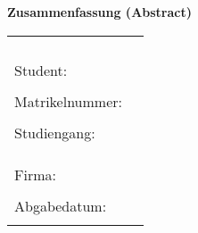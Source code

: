 
\begin{center}
{\Large \textbf{Zusammenfassung (Abstract)}}
\end{center}

\bigskip

\begin{center}
	\begin{tabular}{p{5cm}p{8.5cm}}
		\thema \\
		 & \\
		 & \\
		 & \\
		Student: & \autor \\
		 & \\
		Matrikelnummer: & \matrikelnummer \\
		 & \\
		Studiengang: & \studiengang \\
		 & \\
		 & \\
		 & \\
		Firma: & \firma \\
		 & \\
		Abgabedatum: & \abgabedatum \\
		 & \\
	\end{tabular}
\end{center}

\bigskip

\noindent
\zusammenfassung